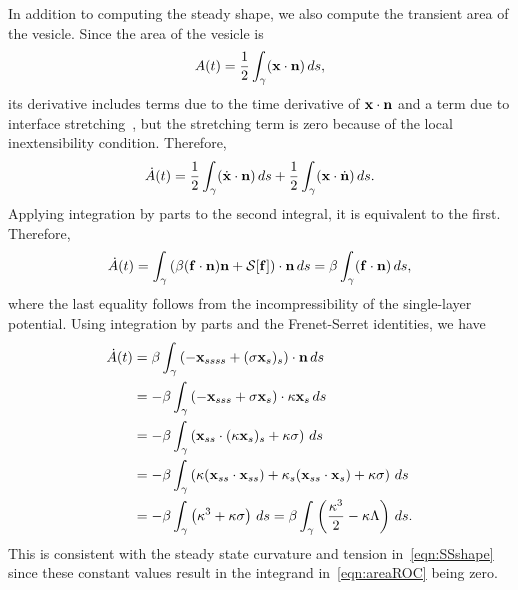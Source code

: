 \documentclass[9pt,twocolumn,twoside,lineno]{pnas-new}
\begin{document}
In addition to computing the steady shape, we also compute the transient
area of the vesicle. Since the area of the vesicle is
\begin{align}
  A(t) = \frac{1}{2}\int_{\gamma} (\mathbf{x} \cdot \mathbf{n})\, ds,
  \label{eqn:area}
\end{align}
its derivative includes terms due to the time derivative of $\mathbf{x} \cdot
\mathbf{n}$ and a term due to interface stretching~\cite{lai-tse-hua2008}, but
the stretching term is zero because of the local inextensibility
condition. Therefore,
\begin{align}
  \dot{A}(t) =
  \frac{1}{2} \int_{\gamma} (\dot{\mathbf{x}} \cdot \mathbf{n})\, ds  + 
  \frac{1}{2} \int_{\gamma} (\mathbf{x} \cdot \dot{\mathbf{n}})\, ds.
\end{align}
Applying integration by parts to the second integral, it is equivalent
to the first.
Therefore,
\begin{align}
  \dot{A}(t) = \int_\gamma \left(\beta (\mathbf{f} \cdot \mathbf{n})\mathbf{n} 
    + \mathcal{S}[\mathbf{f}]\right) \cdot \mathbf{n}\, ds 
  = \beta \int_\gamma (\mathbf{f} \cdot \mathbf{n})\, ds,
\end{align}
where the last equality follows from the incompressibility of the
single-layer potential.  Using integration by parts and the
Frenet-Serret identities, we have
\begin{align}
  \dot{A}(t) &= \beta \int_\gamma \left( -\mathbf{x}_{ssss} + 
    (\sigma \mathbf{x}_s)_s \right) \cdot \mathbf{n} \, ds \\
  &= -\beta \int_\gamma \left(-\mathbf{x}_{sss} + \sigma \mathbf{x}_s 
    \right) \cdot \kappa \mathbf{x}_s \, ds \\
  &= -\beta \int_\gamma \left(\mathbf{x}_{ss} \cdot 
    (\kappa \mathbf{x}_s)_s + \kappa \sigma \right) \, ds \\
  &= -\beta \int_\gamma \left(\kappa (\mathbf{x}_{ss} \cdot \mathbf{x}_{ss}) + 
    \kappa_s (\mathbf{x}_{ss} \cdot \mathbf{x}_s) + \kappa \sigma \right) 
    \, ds \\
  &= -\beta \int_\gamma \left(\kappa^3 + \kappa \sigma \right) 
    \, ds = \beta \int_\gamma \left(
    \frac{\kappa^3}{2} - \kappa \Lambda \right) \, ds.
  \label{eqn:areaROC}
\end{align}
This is consistent with the steady state curvature and tension
in~\eqref{eqn:SSshape} since these constant values result in the
integrand in~\eqref{eqn:areaROC} being zero.
\end{document}
